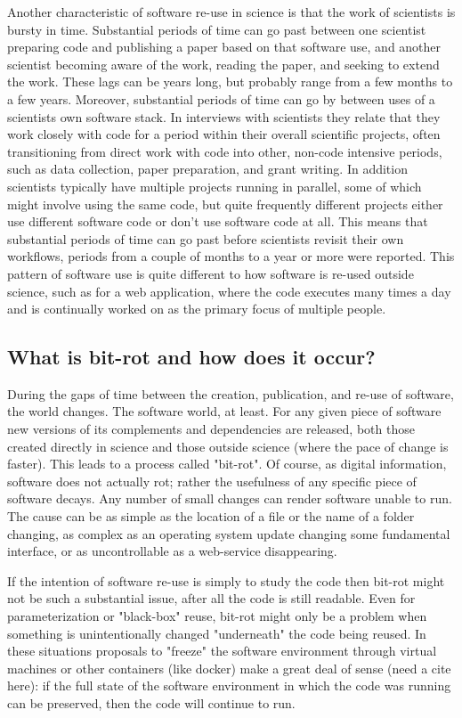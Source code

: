 \documentclass{sigchi}
\begin{document}
Another characteristic of software re-use in science is that the work of scientists is bursty in time. Substantial periods of time can go past between one scientist preparing code and publishing a paper based on that software use, and another scientist becoming aware of the work, reading the paper, and seeking to extend the work. These lags can be years long, but probably range from a few months to a few years. Moreover, substantial periods of time can go by between uses of a scientists own software stack. In interviews with scientists they relate that they work closely with code for a period within their overall scientific projects, often transitioning from direct work with code into other, non-code intensive periods, such as data collection, paper preparation, and grant writing. In addition scientists typically have multiple projects running in parallel, some of which might involve using the same code, but quite frequently different projects either use different software code or don't use software code at all. This means that substantial periods of time can go past before scientists revisit their own workflows, periods from a couple of months to a year or more were reported. This pattern of software use is quite different to how software is re-used outside science, such as for a web application, where the code executes many times a day and is continually worked on as the primary focus of multiple people.

\subsection{What is bit-rot and how does it occur?}

During the gaps of time between the creation, publication, and re-use of software, the world changes.  The software world, at least. For any given piece of software new versions of its complements and dependencies are released, both those created directly in science and those outside science (where the pace of change is faster). This leads to a process called "bit-rot". Of course, as digital information, software does not actually rot; rather the usefulness of any specific piece of software decays. Any number of small changes can render software unable to run.  The cause can be as simple as the location of a file or the name of a folder changing, as complex as an operating system update changing some fundamental interface, or as uncontrollable as a web-service disappearing.

If the intention of software re-use is simply to study the code then bit-rot might not be such a substantial issue, after all the code is still readable. Even for parameterization or "black-box" reuse, bit-rot might only be a problem when something is unintentionally changed "underneath" the code being reused. In these situations proposals to "freeze" the software environment through virtual machines or other containers (like docker) make a great deal of sense (need a cite here): if the full state of the software environment in which the code was running can be preserved, then the code will continue to run.
\end{document}
